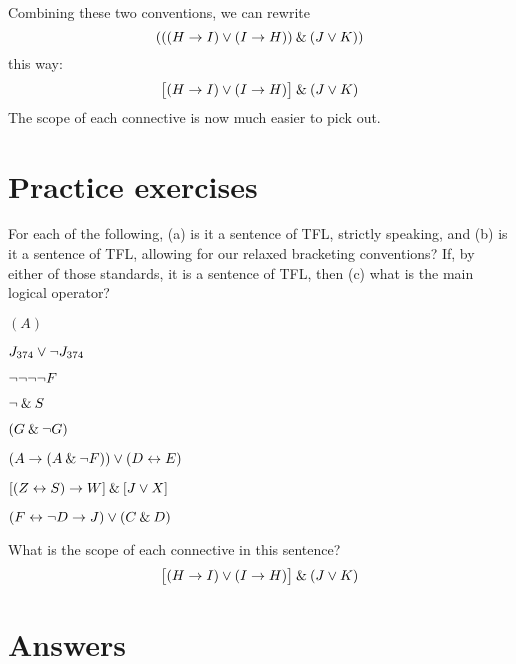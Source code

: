 Combining these two conventions, we can rewrite 
$$(((H \rightarrow I) \vee (I \rightarrow H)) \mathbin{\&} (J \vee K))$$
this way:
$$\bigl[(H \rightarrow I) \vee (I \rightarrow H)\bigr] \mathbin{\&} (J \vee K)$$
The scope of each connective is now much easier to pick out.





\section{Practice exercises}
\setcounter{ProbPart}{0}

\problempart
\label{pr.wiffTFL}
For each of the following, (a) is it a sentence of TFL, strictly speaking, and (b) is it a sentence of TFL, allowing for our relaxed bracketing conventions? If, by either of those standards, it is a sentence of TFL, then (c) what is the main logical operator?
\begin{earg}
\item $(A)$
\item $J_{374} \vee {\neg} J_{374}$
\item ${\neg} {\neg} {\neg} {\neg} F$
\item ${\neg} \mathbin{\&} S$
\item $(G \mathbin{\&} {\neg} G)$
\item $(A \rightarrow (A \mathbin{\&} {\neg} F)) \vee (D \leftrightarrow E)$
\item $[(Z \leftrightarrow S) \rightarrow W] \mathbin{\&} [J \vee X]$
\item $(F \leftrightarrow {\neg} D \rightarrow J) \vee (C \mathbin{\&} D)$
\end{earg}


\problempart
What is the scope of each connective in this sentence?
$$\bigl[(H \rightarrow I) \vee (I \rightarrow H)\bigr] \mathbin{\&} (J \vee K)$$



\section{Answers}
\setcounter{ProbPart}{0}


